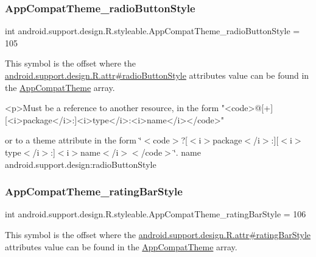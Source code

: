 \subsubsection{\texorpdfstring{App\+Compat\+Theme\+\_\+radio\+Button\+Style}{AppCompatTheme\_radioButtonStyle}}
{\footnotesize\ttfamily int android.\+support.\+design.\+R.\+styleable.\+App\+Compat\+Theme\+\_\+radio\+Button\+Style = 105\hspace{0.3cm}{\ttfamily [static]}}

This symbol is the offset where the \hyperlink{classandroid_1_1support_1_1design_1_1R_1_1attr_ac48d1073bda75cb7de2a7a4c3561389e}{android.\+support.\+design.\+R.\+attr\#radio\+Button\+Style} attribute\textquotesingle{}s value can be found in the \hyperlink{classandroid_1_1support_1_1design_1_1R_1_1styleable_afb351dc8de20cbd4c89abe360373010c}{App\+Compat\+Theme} array.

\begin{DoxyVerb}      <p>Must be a reference to another resource, in the form "<code>@[+][<i>package</i>:]<i>type</i>:<i>name</i></code>"
\end{DoxyVerb}
 or to a theme attribute in the form \char`\"{}$<$code$>$?\mbox{[}$<$i$>$package$<$/i$>$\+:\mbox{]}\mbox{[}$<$i$>$type$<$/i$>$\+:\mbox{]}$<$i$>$name$<$/i$>$$<$/code$>$\char`\"{}.  name android.\+support.\+design\+:radio\+Button\+Style \mbox{\label{classandroid_1_1support_1_1design_1_1R_1_1styleable_a489467c128791a96f0a6869127a31cba}} 
\subsubsection{\texorpdfstring{App\+Compat\+Theme\+\_\+rating\+Bar\+Style}{AppCompatTheme\_ratingBarStyle}}
{\footnotesize\ttfamily int android.\+support.\+design.\+R.\+styleable.\+App\+Compat\+Theme\+\_\+rating\+Bar\+Style = 106\hspace{0.3cm}{\ttfamily [static]}}

This symbol is the offset where the \hyperlink{classandroid_1_1support_1_1design_1_1R_1_1attr_a0c99b738ca23e4fd5b38f04d0b494a99}{android.\+support.\+design.\+R.\+attr\#rating\+Bar\+Style} attribute\textquotesingle{}s value can be found in the \hyperlink{classandroid_1_1support_1_1design_1_1R_1_1styleable_afb351dc8de20cbd4c89abe360373010c}{App\+Compat\+Theme} array.

